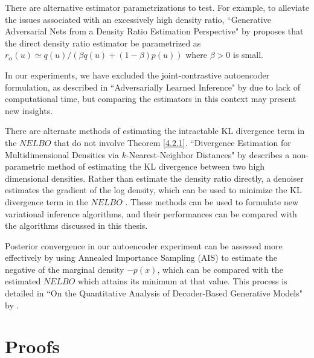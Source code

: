 \documentclass[honours,12pt, twoside]{unswthesis}
\numberwithin{equation}{section}
\theoremstyle{definition}
\begin{document}
There are alternative estimator parametrizations to test. For example, to alleviate the issues associated with an excessively high density ratio, ``Generative Adversarial Nets from a Density Ratio Estimation Perspective" by \citet{bgan} proposes that the direct density ratio estimator be parametrized as $r_\alpha(u)\simeq q(u)/(\beta q(u)+(1-\beta)p(u))$ where $\beta>0$ is small.

In our experiments, we have excluded the joint-contrastive autoencoder formulation, as described in ``Adversarially Learned Inference" by \citet{ali} due to lack of computational time, but comparing the estimators in this context may present new insights.

There are alternate methods of estimating the intractable KL divergence term in the $NELBO$ that do not involve Theorem \ref{4.2.1}. ``Divergence Estimation for Multidimensional Densities via $k$-Nearest-Neighbor Distances" by \citet{wang} describes a non-parametric method of estimating the KL divergence between two high dimensional densities. Rather than estimate the density ratio directly, a denoiser estimates the gradient of the log density, which can be used to minimize the KL divergence term in the $NELBO$ \citep{vincent}. These methods can be used to formulate new variational inference algorithms, and their performances can be compared with the algorithms discussed in this thesis.

Posterior convergence in our autoencoder experiment can be assessed more effectively by using Annealed Importance Sampling (AIS) to estimate the negative of the marginal density $-p(x)$, which can be compared with the estimated $NELBO$ which attains its minimum at that value. This process is detailed in ``On the Quantitative Analysis of Decoder-Based Generative Models" by \citet{ais}.


\clearpage
{}





\newpage
\appendix
\chapter{Proofs}\label{app:A}
\end{document}
